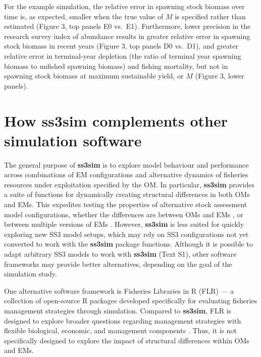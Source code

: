 \documentclass[10pt]{article}
\newcommand{\R}[1]{\label{#1}\linelabel{#1}}
\begin{document}
For the example simulation, the relative error in spawning stock biomass over
time is, as expected, smaller when the true value of $M$ is specified rather
than estimated (Figure 3, top panels E0 vs.~E1). Furthermore, lower precision
in the research survey index of abundance results in greater relative error in
spawning stock biomass in recent years (Figure 3, top panels D0 vs.~D1), and
greater relative error in terminal-year depletion (the ratio of terminal year
spawning biomass to unfished spawning biomass) and fishing mortality, but not
in spawning stock biomass at maximum sustainable yield, or $M$ (Figure 3, lower
panels).

\section*{How ss3sim complements other simulation software}

The general purpose of \textbf{ss3sim} is to explore model behaviour and
performance across combinations of EM configurations and alternative dynamics
of fisheries resources under exploitation specified by the OM. In particular,
\textbf{ss3sim} provides a suite of functions for dynamically creating
structural differences in both OMs and EMs. This expedites testing the
properties of alternative stock assessment model configurations, whether the
differences are between OMs and EMs \cite{johnson2014}, or between multiple
versions of EMs \cite{ono2014}. However, \textbf{ss3sim} is less suited for
quickly exploring new SS3 model setups, which may rely on SS3 configurations
not yet converted to work with the \textbf{ss3sim} package functions.
\R{B23}Although it is possible to adapt arbitrary SS3 models to work with
\textbf{ss3sim} (Text S1), other software frameworks may provide better
alternatives, depending on the goal of the simulation study.

One alternative software framework is Fisheries Libraries in \textsf{R} (FLR)
\cite{kell2007} --- a collection of open-source \textsf{R} packages developed
specifically for evaluating fisheries management strategies through simulation.
Compared to \textbf{ss3sim}, FLR is designed to explore broader questions
regarding management strategies with flexible biological, economic, and
management components \cite{hillary2009}. Thus, it is not specifically designed
to explore the impact of structural differences within OMs and EMs.
\end{document}
